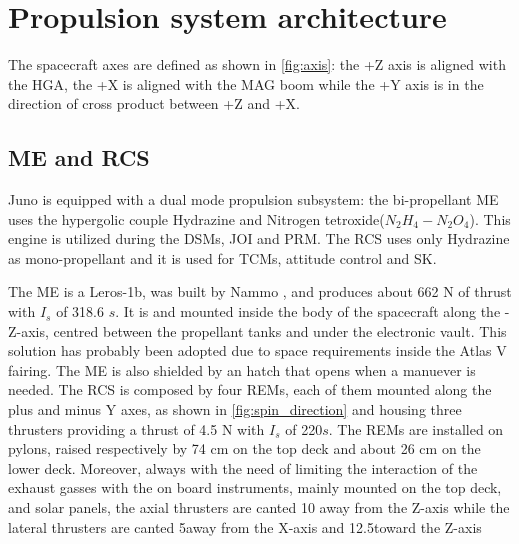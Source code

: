 \section{Propulsion system architecture}
\label{sec:prop_architecture}


The spacecraft axes are defined as shown in \autoref{fig:axis}: the +Z axis is aligned with the HGA, the +X is aligned with the MAG boom while the +Y axis is in the direction of cross product between +Z and +X.


\subsection{ME and RCS}
Juno is equipped with a dual mode propulsion subsystem: the bi-propellant ME uses the hypergolic couple Hydrazine and Nitrogen tetroxide($N_2H_4 - N_2O_4$). This engine is utilized during the DSMs, JOI and PRM.  The RCS uses only Hydrazine as mono-propellant and it is used for TCMs, attitude control and SK. 

The ME is a Leros-1b, was built by Nammo \cite{Leros},  
and produces about 662 N of thrust with $I_s$ of 318.6 $s$. It is and mounted inside the body of the spacecraft along the -Z-axis, centred between the propellant tanks and under the electronic vault. This solution has probably been adopted due to space requirements inside the Atlas V fairing. The ME is also shielded by an hatch that opens when a manuever is needed. 
The RCS is composed by four REMs, each of them mounted along the plus and minus Y axes, as shown in \autoref{fig:spin_direction} and housing three thrusters providing a thrust of 4.5 N with $I_s$ of 220$s$. The REMs are installed on pylons, raised respectively by 74 cm on the top deck and about 26 cm on the lower deck. Moreover, always with the need of limiting the interaction of the exhaust gasses with the on board instruments, mainly mounted on the top deck, and solar panels, the axial thrusters are canted 10 \textdegree  away from the Z-axis while the lateral thrusters are canted 5\textdegree away from the X-axis and 12.5\textdegree toward the Z-axis 





